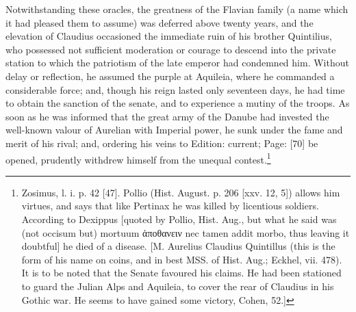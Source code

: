 Notwithstanding these oracles, the greatness of the Flavian family (a name which it had pleased them to assume) was deferred above twenty years, and the elevation of Claudius occasioned the immediate ruin of his brother Quintilius, who possessed not sufficient moderation or courage to descend into the private station to which the patriotism of the late emperor had condemned him. Without delay or reflection, he assumed the purple at Aquileia, where he commanded a considerable force; and, though his reign lasted only seventeen days, he had time to obtain the sanction of the senate, and to experience a mutiny of the troops. As soon as he was informed that the great army of the Danube had invested the well-known valour of Aurelian with Imperial power, he sunk under the fame and merit of his rival; and, ordering his veins to Edition: current; Page: [70] be opened, prudently withdrew himself from the unequal contest.\footnote{Zosimus, l. i. p. 42 [47]. Pollio (Hist. August. p. 206 [xxv. 12, 5]) allows him virtues, and says that like Pertinax he was killed by licentious soldiers. According to Dexippus [quoted by Pollio, Hist. Aug., but what he said was (not occisum but) mortuum \textgreek{\texthebrew{ἀ}ποθανειν} nec tamen addit morbo, thus leaving it doubtful] he died of a disease. [M. Aurelius Claudius Quintillus (this is the form of his name on coins, and in best MSS. of Hist. Aug.; Eckhel, vii. 478). It is to be noted that the Senate favoured his claims. He had been stationed to guard the Julian Alps and Aquileia, to cover the rear of Claudius in his Gothic war. He seems to have gained some victory, Cohen, 52.]}

